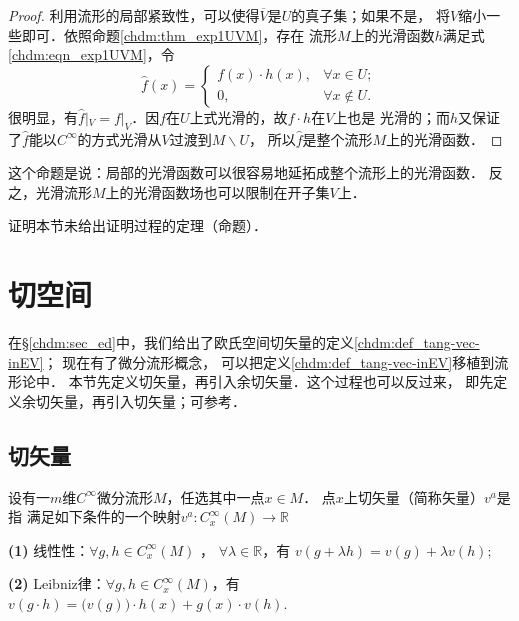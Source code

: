 \begin{proof}
    利用流形的局部紧致性，可以使得$\overline{V}$是$U$的真子集；如果不是，
    将$V$缩小一些即可．依照命题\ref{chdm:thm_exp1UVM}，存在
    流形$M$上的光滑函数$h$满足式\eqref{chdm:eqn_exp1UVM}，令
    \begin{equation}
        \hat{f}(x)=\begin{cases}
            f(x)\cdot h(x), & \forall x\in U ; \\
            0, & \forall x\notin U .
        \end{cases}
    \end{equation}
    很明显，有$\hat{f}|_V = f|_V$．因$f$在$U$上式光滑的，故$f\cdot h$在$V$上也是
    光滑的；而$h$又保证了$\hat{f}$能以$C^\infty$的方式光滑从$V$过渡到$M\backslash U$，
    所以$\hat{f}$是整个流形$M$上的光滑函数．
\end{proof}
这个命题是说：局部的光滑函数可以很容易地延拓成整个流形上的光滑函数．
反之，光滑流形$M$上的光滑函数场也可以限制在开子集$V$上．


\begin{exercise}
	证明本节未给出证明过程的定理（命题）．
\end{exercise}

\section{切空间}\label{chdm:sec_tangentspace}
在\S\ref{chdm:sec_ed}中，我们给出了欧氏空间切矢量的定义\ref{chdm:def_tang-vec-inEV}；
现在有了微分流形概念，
可以把定义\ref{chdm:def_tang-vec-inEV}移植到流形论中．
本节先定义切矢量，再引入余切矢量．这个过程也可以反过来，
即先定义余切矢量，再引入切矢量；可参考\parencite[\S 1.2]{cc2001-zh}．


\subsection{切矢量}
\begin{definition}\label{chdm:def_tang-vec-inManifold}
    设有一$m$维$C^\infty$微分流形$M$，任选其中一点$x\in M$．
    点$x$上{\heiti 切矢量}（简称{\heiti 矢量}）$v^a$是指
    满足如下条件的一个映射$v^a:C_x^\infty(M)\to \mathbb{R}$  
        
    {\bfseries (1)} 线性性：$\forall g,h \in C^\infty_x(M) $ ， $\forall \lambda \in \mathbb{R}$，有
    $v (g+\lambda h) = v (g)+ \lambda v (h) ;$
    
    {\bfseries (2)} Leibniz律：$\forall g,h \in C^\infty_x(M) $，有
    $v (g\cdot h) = \bigl(v(g)\bigr)\cdot h(x)+ g(x)\cdot v (h) .$
\end{definition}

